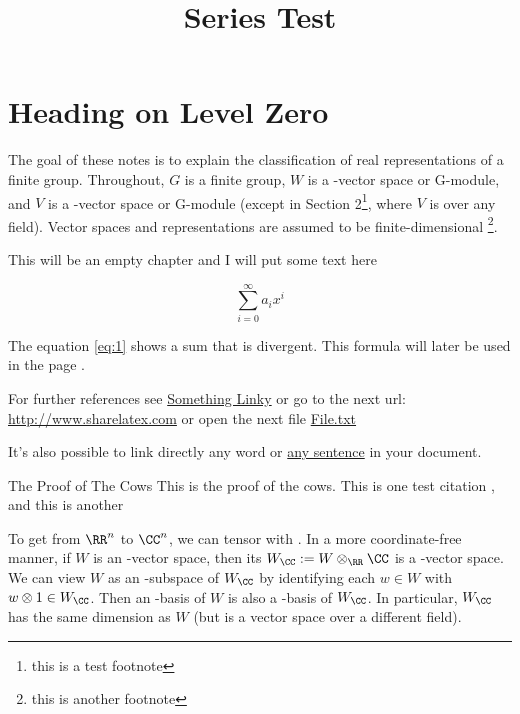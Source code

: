 \documentclass{scrartcl}
\title{\huge Series Test}
\begin{document}
\maketitle
\begin{abstract}
    \lipsum[1]
\end{abstract}


\section{Heading on Level Zero}

\rightmark The goal of these notes is to explain the classification of real representations of a finite
group. Throughout, $G$ is a finite group, $W$ is a \RR-vector space or \RR G-module, and $V$ is a
\CC-vector space or \CC G-module (except in Section 2\footnote{this is a test footnote}, where $V$ is over any field). Vector spaces
and representations are assumed to be finite-dimensional \footnote{this is another footnote}.


This will be an empty chapter and I will put some text here

\begin{equation}
\sum_{i=0}^{\infty} a_i x^i
\end{equation}

The equation \ref{eq:1} shows a sum that is divergent. This formula 
will later be used in the page \pageref{second}.

For further references see \href{http://www.sharelatex.com}{Something 
Linky} or go to the next url: \url{http://www.sharelatex.com} or open 
the next file \href{run:./file.txt}{File.txt}

It's also possible to link directly any word or 
\hyperlink{thesentence}{any sentence} in your document.


\begin{subproof*}{The Proof of The Cows}
This is the proof of the cows. This is one test citation \cite{Lee}, and this is another \cite{Artin}
\end{subproof*}

To get from $\RR^n$ to $\CC^n$, we can tensor with \CC. In a more coordinate-free
manner, if $W$ is an \RR-vector space, then its  $W_{\CC} := W \otimes_{\RR} \CC$ is a \CC-vector
space. We can view $W$ as an \RR-subspace of $W_{\CC}$ by identifying each $w \in W$ with $w \otimes 1 \in W_{\CC}$.
Then an \RR-basis of $W$ is also a \CC-basis of $W_{\CC}$. In particular, $W_{\CC}$ has the same dimension as
$W$ (but is a vector space over a different field).
\end{document}
